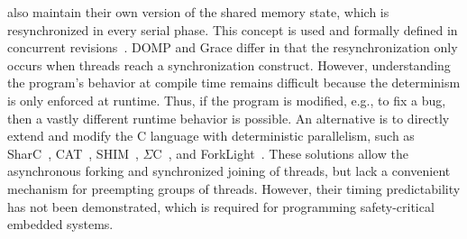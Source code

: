 also maintain their own version of the shared memory state, which
is resynchronized in every serial phase. This concept 
is used and formally defined in concurrent revisions~\cite{BurckhardtL11}. 
DOMP and Grace differ in that the resynchronization only 
occurs when threads reach a synchronization construct.
However, understanding the program's behavior at compile time 
remains difficult because the determinism is only enforced at 
runtime. Thus, if the program is modified, e.g., to fix a 
bug, then a vastly different runtime behavior is possible.  
An alternative is to directly extend and 
modify the C language with deterministic parallelism, such as
SharC~\cite{multiprocessing_data_race_detection}, 
\textsc{CAT}~\cite{multiprocessing_cat}, 
SHIM~\cite{multiprocessing_shim_scheduling}, 
$\Sigma$C~\cite{multiprocessing_sigmac}, and
ForkLight~\cite{multiprocessing_forklight}. These solutions 
allow the asynchronous forking and synchronized joining 
of threads, but lack a convenient mechanism for preempting 
groups of threads. However, their timing predictability 
has not been demonstrated, which is required for programming 
safety-critical embedded systems.

